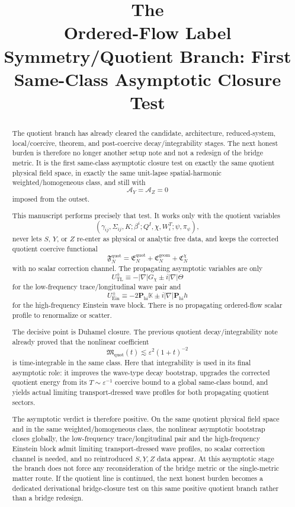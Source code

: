 \documentclass[11pt]{article}
\title{\textbf{The \TheoryName{}}\\[0.4em]
\large Ordered-Flow Label Symmetry/Quotient Branch: First Same-Class Asymptotic Closure Test}
\author{}
\date{}
\newcommand{\AY}{\mathcal A_Y}
\newcommand{\AZ}{\mathcal A_Z}
\begin{document}
\maketitle

\begin{abstract}
The quotient branch has already cleared the candidate, architecture, reduced-system, local/coercive, theorem, and post-coercive decay/integrability stages. The next honest burden is therefore no longer another setup note and not a redesign of the bridge metric. It is the first same-class asymptotic closure test on exactly the same quotient physical field space, in exactly the same unit-lapse spatial-harmonic weighted/homogeneous class, and still with
\[
\AY=\AZ=0
\]
imposed from the outset.

This manuscript performs precisely that test. It works only with the quotient variables
\[
(\gamma_{ij},\Sigma_{ij},K;\beta^i;Q^I,\chi,W_i^T;\psi,\pi_\psi),
\]
never lets \(S\), \(Y\), or \(Z\) re-enter as physical or analytic free data, and keeps the corrected quotient coercive functional
\[
\mathfrak F_N^{\mathrm{quot}}
=
\mathfrak E_N^{\mathrm{quot}}
+\mathfrak C_N^{\mathrm{geom}}
+\mathfrak C_N^\chi
\]
with no scalar correction channel. The propagating asymptotic variables are only
\[
U_{\mathrm{TL}}^\pm
\equiv
-|\nabla|G_\chi \pm i|\nabla|\Theta
\]
for the low-frequency trace/longitudinal wave pair and
\[
U_{\mathrm{Ein}}^\pm
\equiv
-2\mathbf P_{\mathrm{hi}}\mathbb K
\pm i|\nabla|\mathbf P_{\mathrm{hi}}h
\]
for the high-frequency Einstein wave block. There is no propagating ordered-flow scalar profile to renormalize or scatter.

The decisive point is Duhamel closure. The previous quotient decay/integrability note already proved that the nonlinear coefficient
\[
\mathfrak M_{\mathrm{quot}}(t)
\lesssim
\varepsilon^2(1+t)^{-2}
\]
is time-integrable in the same class. Here that integrability is used in its final asymptotic role: it improves the wave-type decay bootstrap, upgrades the corrected quotient energy from its \(T\sim \varepsilon^{-1}\) coercive bound to a global same-class bound, and yields actual limiting transport-dressed wave profiles for both propagating quotient sectors.

The asymptotic verdict is therefore positive. On the same quotient physical field space and in the same weighted/homogeneous class, the nonlinear asymptotic bootstrap closes globally, the low-frequency trace/longitudinal pair and the high-frequency Einstein block admit limiting transport-dressed wave profiles, no scalar correction channel is needed, and no reintroduced \(S,Y,Z\) data appear. At this asymptotic stage the branch does not force any reconsideration of the bridge metric or the single-metric matter route. If the quotient line is continued, the next honest burden becomes a dedicated derivational bridge-closure test on this same positive quotient branch rather than a bridge redesign.
\end{abstract}
\end{document}
